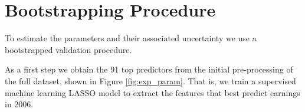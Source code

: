 \documentclass[12pt, a4paper]{article}
\begin{document}
%
%
%


\clearpage
\section{Bootstrapping Procedure}
\label{app:boot}

To estimate the parameters and their associated uncertainty we use a bootstrapped validation procedure.

As a first step we obtain the 91 top predictors from the initial
pre-processing of the full dataset, shown in Figure \ref{fig:exp_param}. That
is, we train a supervised machine learning LASSO model to extract the features
that best predict earnings in 2006.
\end{document}
